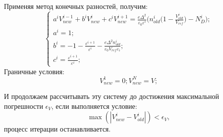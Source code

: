 Применяя метод конечных разностей, получим:
\begin{equation}
	\begin{cases}
		a^{i}V_{new}^{i-1} + b^{i}V_{new}^{i} + c^{i}V^{i+1}_{new} = \frac{e\Delta^{2}}{\varepsilon_{0}\varepsilon^{i}}\bigg( n_{old}^{i}\bigg( 1 - \frac{V_{old}^{i}}{V_{ref}} \bigg) - N_{D}^{i} \bigg);\\
		a^{i} = 1;\\
		b^{i} = -1 - \frac{\varepsilon^{i+1}}{\varepsilon^{i}} -\frac{e\Delta^{2}n_{old}^{i}}{\varepsilon_{0} V_{ref}\varepsilon_{i}};\\
		c^{i} = \frac{\varepsilon^{i+1}}{\varepsilon^{i}};
	\end{cases}
\end{equation}
Граничные условия:
\begin{equation}
	V^{1}_{new} = 0;
	V^{N}_{new} = V;
\end{equation}

И продолжаем рассчитывать эту систему до достижения максимальной погрешности $\epsilon_{V}$, если выполняется условие:
\begin{equation}
 	\max(|V_{new}^{i} - V_{old}^{i}|) < \epsilon_{V},
\end{equation} 
процесс итерации останавливается.